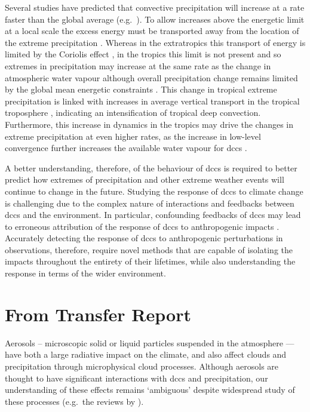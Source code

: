 Several studies have predicted that convective precipitation will increase at a rate faster than the global average (e.g.\ \citet{ogorman_physical_2009, muller_intensification_2011, ogorman_precipitation_2015, donat_more_2016}).
To allow increases above the energetic limit at a local scale the excess energy must be transported away from the location of the extreme precipitation \citep{muller_energetic_2011}.
Whereas in the extratropics this transport of energy is limited by the Coriolis effect \citep{ogorman_physical_2009}, in the tropics this limit is not present and so extremes in precipitation may increase at the same rate as the change in atmospheric water vapour \citep{ogorman_energetic_2012} although overall precipitation change remains limited by the global mean energetic constraints \citep{allen_constraints_2002}.
This change in tropical extreme precipitation is linked with increases in average vertical transport in the tropical troposphere \citep{muller_energetic_2011}, indicating an intensification of tropical deep convection.
Furthermore, this increase in dynamics in the tropics may drive the changes in extreme precipitation at even higher rates, as the increase in low-level convergence further increases the available water vapour for \acrshort{dcc}s \citep{ogorman_energetic_2012}.

A better understanding, therefore, of the behaviour of \acrshort{dcc}s is required to better predict how extremes of precipitation and other extreme weather events will continue to change in the future.
Studying the response of \acrshort{dcc}s to climate change is challenging due to the complex nature of interactions and feedbacks between \acrshort{dcc}s and the environment.
In particular, confounding feedbacks of \acrshort{dcc}s may lead to erroneous attribution of the response of \acrshort{dcc}s to anthropogenic impacts \citep{varble_erroneous_2018}.
Accurately detecting the response of \acrshort{dcc}s to anthropogenic perturbations in observations, therefore, require novel methods that are capable of isolating the impacts throughout the entirety of their lifetimes, while also understanding the response in terms of the wider environment.


\section{From Transfer Report}

Aerosols – microscopic solid or liquid particles suspended in the atmosphere --- have both a large radiative  impact on the climate, and also affect clouds and precipitation through microphysical cloud processes. 
Although aerosols are thought to have significant interactions with \acrshort{dcc}s and precipitation, our understanding of these effects remains ‘ambiguous’ \citep{IPCCCloudsAeorosolsBoucher2013} despite widespread study of these processes (e.g.\ the reviews by \citet{levin_aerosol_2008, tao_impact_2012, fan_review_2016}).

